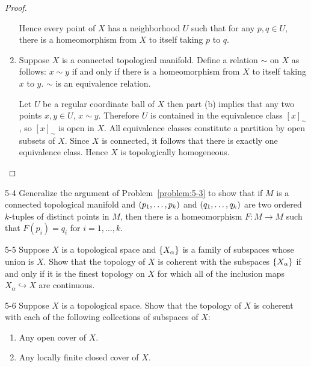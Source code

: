 \begin{proof}
\begin{enumerate}[label={(\alph*)}]
		      Hence every point of $X$ has a neighborhood $U$ such that for any $p, q \in U$, there is a homeomorphism from $X$ to itself taking $p$ to $q$.
		\item Suppose $X$ is a connected topological manifold. Define a relation $\sim$ on $X$ as follows: $x \sim y$ if and only if there is a homeomorphism from $X$ to itself taking $x$ to $y$. $\sim$ is an equivalence relation.

		      Let $U$ be a regular coordinate ball of $X$ then part (b) implies that any two points $x, y\in U$, $x \sim y$. Therefore $U$ is contained in the equivalence class ${[x]}_{\sim}$, so ${[x]}_{\sim}$ is open in $X$. All equivalence classes constitute a partition by open subsets of $X$. Since $X$ is connected, it follows that there is exactly one equivalence class. Hence $X$ is topologically homogeneous.
	\end{enumerate}
\end{proof}

\begin{problem}{5-4}\label{problem:5-4}
Generalize the argument of Problem~\ref{problem:5-3} to show that if $M$ is a connected topological manifold and $\left({p_{1}, \ldots, p_{k}}\right)$ and $\left({q_{1}, \ldots, q_{k}}\right)$ are two ordered $k$-tuples of distinct points in $M$, then there is a homeomorphism $F: M \to M$ such that $F(p_{i}) = q_{i}$ for $i = 1, \ldots, k$.
\end{problem}

\begin{problem}{5-5}\label{problem:5-5}
Suppose $X$ is a topological space and $\left\{{X_{\alpha}}\right\}$ is a family of subspaces whose union is $X$. Show that the topology of $X$ is coherent with the subspaces $\left\{{X_{\alpha}}\right\}$ if and only if it is the finest topology on $X$ for which all of the inclusion maps $X_{\alpha} \hookrightarrow{} X$ are continuous.
\end{problem}

\begin{problem}{5-6}\label{problem:5-6}
Suppose $X$ is a topological space. Show that the topology of $X$ is coherent with each of the following collections of subspaces of $X$:
\begin{enumerate}[label={(\alph*)}]
	\item Any open cover of $X$.
	\item Any locally finite closed cover of $X$.
\end{enumerate}
\end{problem}

